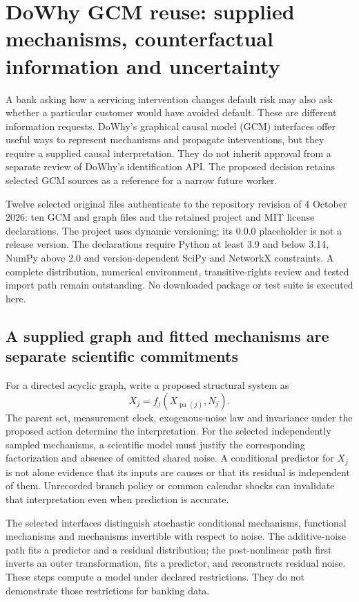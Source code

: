 \section{DoWhy GCM reuse: supplied mechanisms, counterfactual information and uncertainty}
\label{sec:exec24-gcm-reuse}

A bank asking how a servicing intervention changes default risk may also
ask whether a particular customer would have avoided default. These are
different information requests. DoWhy's graphical causal model (GCM)
interfaces offer useful ways to represent mechanisms and propagate
interventions, but they require a supplied causal interpretation. They do
not inherit approval from a separate review of DoWhy's identification API.
The proposed decision retains selected GCM sources as a reference for a
narrow future worker.~\citep{exec24_gcm_source,exec24_gcm_choice}

Twelve selected original files authenticate to the repository revision of
4 October 2026: ten GCM and graph files and the retained project and MIT
license declarations. The project uses dynamic versioning; its 0.0.0
placeholder is not a release version. The declarations require Python
at least 3.9 and below 3.14, NumPy above 2.0 and version-dependent SciPy
and NetworkX constraints. A complete distribution, numerical environment,
transitive-rights review and tested import path remain outstanding.
No downloaded package or test suite is executed here.
\citep{exec24_gcm_source}

\subsection{A supplied graph and fitted mechanisms are separate scientific commitments}
For a directed acyclic graph, write a proposed structural system as
\[
 X_j=f_j(X_{\operatorname{pa}(j)},N_j).
\]
The parent set, measurement clock, exogenous-noise law and invariance
under the proposed action determine the interpretation. For the selected
independently sampled mechanisms, a scientific model must justify the
corresponding factorization and absence of omitted shared noise. A conditional
predictor for $X_j$ is not alone evidence that its inputs are causes or
that its residual is independent of them. Unrecorded branch policy or
common calendar shocks can invalidate that interpretation even when
prediction is accurate.~\citep{exec24_gcm_choice}

The selected interfaces distinguish stochastic conditional mechanisms,
functional mechanisms and mechanisms invertible with respect to noise.
The additive-noise path fits a predictor and a residual distribution;
the post-nonlinear path first inverts an outer transformation, fits a
predictor, and reconstructs residual noise. These steps compute a model
under declared restrictions. They do not demonstrate those restrictions
for banking data.~\citep{exec24_gcm_source}

